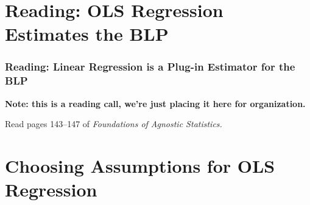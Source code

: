 \documentclass[12pt, block=fill]{beamer}
\begin{document}
\section{Reading: OLS Regression Estimates the BLP}

\begin{frame}
  \frametitle{Reading: Linear Regression is a Plug-in Estimator for the BLP}

  \textbf{Note: this is a reading call, we're just placing it here for
    organization.}

  Read pages 143–147 of \textit{Foundations of Agnostic Statistics.} 
\end{frame} 




%
%
%



\section{Choosing Assumptions for OLS Regression}
\end{document}
